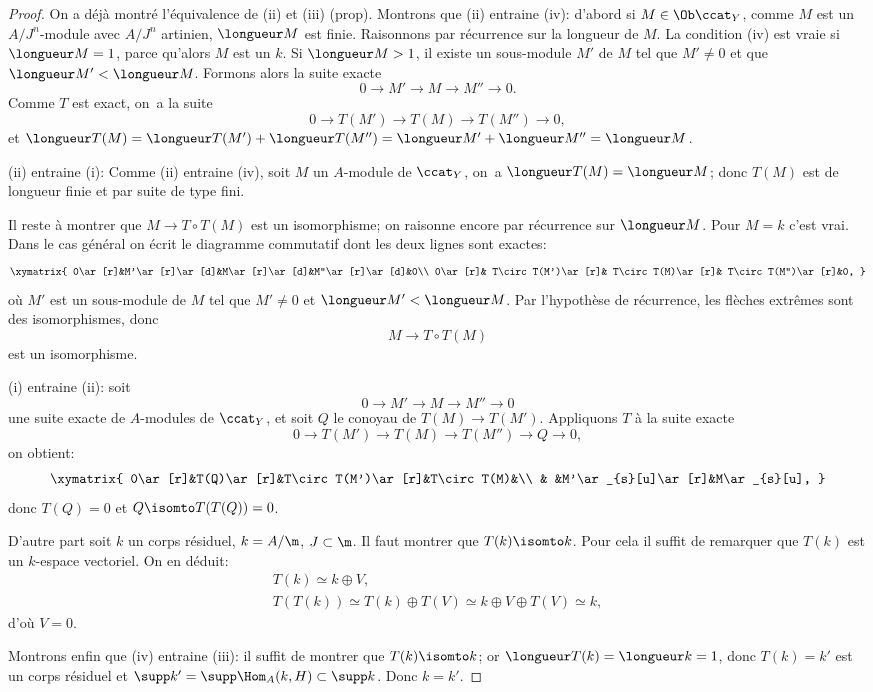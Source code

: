 \begin{proof}
On a d\'ej\`a montr\'e l'\'equivalence de (ii) et (iii) (prop\ptbl {}). Montrons que (ii) entraine (iv): d'abord si $M\in \Ob \ccat_{Y}$, comme $M$ est un $A/J^{n}$-module avec $A/J^{n}$ artinien, $\longueur M$ est finie. Raisonnons par r\'ecurrence sur la longueur de $M$. La condition (iv) est vraie si $\longueur M=1$, parce qu'alors $M$ est un $k$. Si $\longueur M>1$, il existe un sous-module $M'$ de $M$ tel que $M'\neq 0$ et que $\longueur M'<\longueur M$. Formons alors la suite exacte
$$
0\to M'\to M\to M''\to 0.
$$
Comme $T$ est exact, on~a la suite
$$
0\to T(M')\to T(M)\to T(M'')\to 0,
$$
et $\longueur T(M)=\longueur T(M')+\longueur T(M'')=\longueur M'+\longueur M''=\longueur M$.

(ii) entraine (i): Comme (ii) entraine (iv), soit $M$ un $A$-module de $\ccat_{Y}$, on~a $\longueur T(M)=\longueur M$; donc $T(M)$ est de longueur finie et par suite de type fini.

Il reste \`a montrer que $M\to T\circ T(M)$ est un isomorphisme; on raisonne encore par r\'ecurrence sur $\longueur M$. Pour $M=k$ c'est vrai. Dans le cas g\'en\'eral on \'ecrit le diagramme commutatif dont les deux lignes sont exactes\pageoriginaled:
$$
\xymatrix{ 0\ar[r]&M'\ar[r]\ar[d]&M\ar[r]\ar[d]&M''\ar[r]\ar[d]&0\\
0\ar[r]& T\circ T(M')\ar[r]& T\circ T(M)\ar[r]& T\circ T(M'')\ar[r]&0, }
$$
o\`u $M'$ est un sous-module de $M$ tel que $M'\neq 0$ et $\longueur M'<\longueur M$. Par l'hypoth\`ese de r\'ecurrence, les fl\`eches extr\^emes sont des isomorphismes, donc
$$
M\to T\circ T(M)
$$
est un isomorphisme.

(i) entraine (ii): soit
$$
0\to M'\to M\to M''\to 0
$$
une suite exacte de $A$-modules de $\ccat_{Y}$, et soit $Q$ le conoyau de $T(M)\to T(M')$. Appliquons $T$ \`a la suite exacte
$$
0\to T(M')\to T(M)\to T(M'')\to Q \to 0,
$$
on obtient:
$$
\xymatrix{
0\ar[r]&T(Q)\ar[r]&T\circ T(M')\ar[r]&T\circ T(M)&\\
& &M'\ar_{s}[u]\ar[r]&M\ar_{s}[u],
}
$$
donc $T(Q)=0$ et $Q\isomto T(T(Q))=0$.

D'autre part soit $k$ un corps r\'esiduel, $k=A/\m$, $J\subset \m$. Il faut montrer que $T(k)\isomto k$. Pour cela il suffit de remarquer que $T(k)$ est un $k$-espace vectoriel. On en d\'eduit:
\begin{gather*}
T(k)\simeq k\oplus V,\\
T(T(k))\simeq T(k)\oplus T(V)\simeq k\oplus V\oplus T(V)\simeq k,
\end{gather*}
d'o\`u $V=0$.

Montrons enfin que (iv) entraine (iii): il suffit de montrer que $T(k)\isomto k$; or $\longueur T(k)= \longueur k=1$, donc $T(k)=k'$ est un corps r\'esiduel et $\supp k'= \supp \Hom_{A}(k, H)\subset \supp k$. Donc $k=k'$.
\skipqed
\end{proof}

